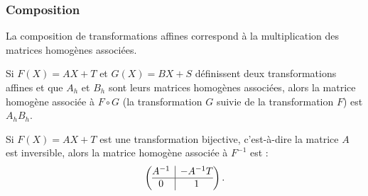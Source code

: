 \documentclass[11pt,class=report,crop=false]{standalone}
\begin{document}
\begin{exemple}
\end{exemple}	


\subsubsection*{Composition}

La composition de transformations affines correspond à la multiplication des matrices homogènes associées.

\begin{proposition}
\label{prop:prodhomog}	
Si $F(X) = AX + T$	et $G(X) = BX+S$ définissent deux transformations affines et que $A_h$ et $B_h$ sont leurs matrices homogènes associées, alors 
la matrice homogène associée à $F \circ G$ (la transformation $G$ suivie de la transformation $F$) est $A_hB_h$.
\end{proposition}

\begin{proposition}
\label{prop:invhomog}	
Si $F(X) = AX + T$ est une transformation bijective, c'est-à-dire la matrice $A$ est inversible, alors la matrice homogène associée à $F^{-1}$ est :
$$
\left(\begin{array}{@{}c|c@{}}
	A^{-1} & -A^{-1}T \\\hline
	0 & 1 
\end{array}\right).
$$
\end{proposition}
\end{document}
